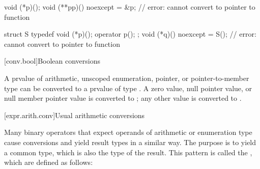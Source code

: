 \begin{example}
\begin{codeblock}
void (*p)();
void (**pp)() noexcept = &p;    // error: cannot convert to pointer to  function

struct S { typedef void (*p)(); operator p(); };
void (*q)() noexcept = S();     // error: cannot convert to pointer to  function
\end{codeblock}
\end{example}

[conv.bool]{Boolean conversions}

\pnum
{}%
A prvalue of arithmetic, unscoped enumeration, pointer, or pointer-to-member
type can be converted to a prvalue of type . A zero value, null
pointer value, or null member pointer value is converted to ; any
other value is converted to .


[expr.arith.conv]{Usual arithmetic conversions}

\pnum
Many binary operators that expect operands of arithmetic or enumeration
type cause conversions and yield result types in a similar way. The
purpose is to yield a common type, which is also the type of the result.
This pattern is called the ,
which are defined as follows:

